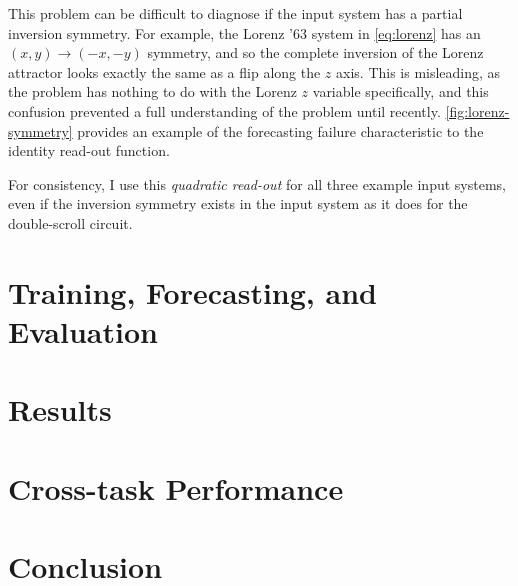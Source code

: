 This problem can be difficult to diagnose if the input system has a
partial inversion symmetry. For example, the Lorenz '63 system in
\cref{eq:lorenz} has an $(x, y) \rightarrow (-x, -y)$ symmetry, and so the
complete inversion of the Lorenz attractor looks exactly the same as a
flip along the $z$ axis. This is misleading, as the problem has
nothing to do with the Lorenz $z$ variable specifically, and this
confusion prevented a full understanding of the problem until
recently.\cite{herteux2020} \cref{fig:lorenz-symmetry} provides an
example of the forecasting failure characteristic to the identity
read-out function.

For consistency, I use this \emph{quadratic read-out} for all three
example input systems, even if the inversion symmetry exists in the
input system as it does for the double-scroll circuit.

\section{Training, Forecasting, and Evaluation}

\section{Results}

\section{Cross-task Performance}

\section{Conclusion}

